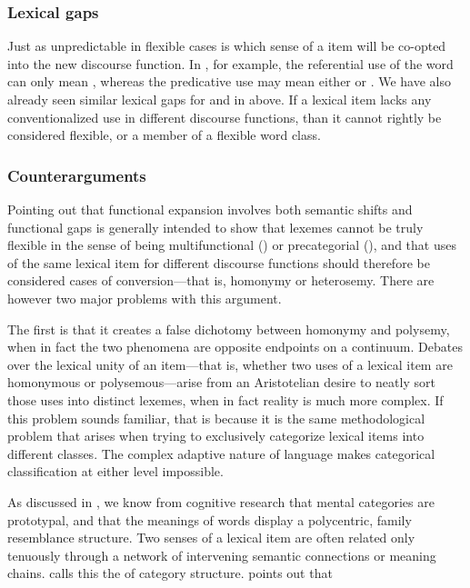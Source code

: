 \subsubsection{Lexical gaps}
\label{sec:2.3.3.3}

Just as unpredictable in flexible cases is which sense of a item will be co-opted into the new discourse function. In , for example, the referential use of the word  can only mean , whereas the predicative use may mean either  or  \parencite[91]{Kihm2017}. We have also already seen similar lexical gaps for  and  in  above. If a lexical item lacks any conventionalized use in different discourse functions, than it cannot rightly be considered flexible, or a member of a flexible word class.

\subsubsection{Counterarguments}
\label{sec:2.3.3.4}

Pointing out that functional expansion involves both semantic shifts and functional gaps is generally intended to show that lexemes cannot be truly flexible in the sense of being multifunctional () or precategorial (), and that uses of the same lexical item for different discourse functions should therefore be considered cases of conversion—that is, homonymy or heterosemy. There are however two major problems with this argument.

The first is that it creates a false dichotomy between homonymy and polysemy, when in fact the two phenomena are opposite endpoints on a continuum. Debates over the lexical unity of an item—that is, whether two uses of a lexical item are homonymous or polysemous—arise from an Aristotelian desire to neatly sort those uses into distinct lexemes, when in fact reality is much more complex. If this problem sounds familiar, that is because it is the same methodological problem that arises when trying to exclusively categorize lexical items into different classes. The complex adaptive nature of language makes categorical classification at either level impossible.

As discussed in , we know from cognitive research that mental categories are prototypal, and that the meanings of words display a polycentric, family resemblance structure. Two senses of a lexical item are often related only tenuously through a network of intervening semantic connections or meaning chains. \textcite{Langacker1988} calls this the  of category structure. \citeauthor{Taylor2003} points out that 

